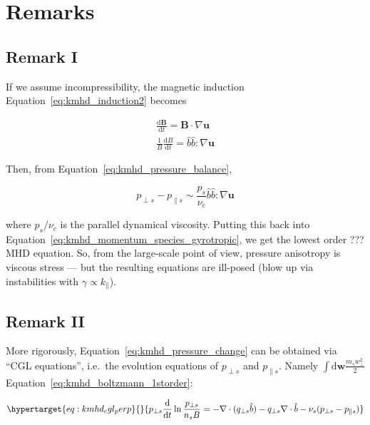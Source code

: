 \documentclass[
  notoc %
]{tufte-book}
\begin{document}
\hypertarget{remarks}{%
\section{Remarks}\label{remarks}}

\hypertarget{remark-i}{%
\subsection{Remark I}\label{remark-i}}

If we assume incompressibility, the magnetic induction
Equation~\ref{eq:kmhd_induction2} becomes

\[
\begin{aligned}
\frac{\mathrm{d}\mathbf{B}}{\mathrm{d}t} = \mathbf{B}\cdot\nabla\mathbf{u} \\
\frac{1}{B}\frac{\mathrm{d}B}{\mathrm{d}t} = \hat{b}\hat{b}:\nabla\mathbf{u}
\end{aligned}
\]

Then, from Equation~\ref{eq:kmhd_pressure_balance},

\[
p_{\perp s} - p_{\parallel s}\sim\frac{p_s}{\nu_c}\hat{b}\hat{b}:\nabla\mathbf{u}
\]

where \(p_s/\nu_c\) is the parallel dynamical viscosity. Putting this
back into Equation~\ref{eq:kmhd_momentum_species_gyrotropic}, we get the
lowest order ??? MHD equation. So, from the large-scale point of view,
pressure anisotropy is viscous stress --- but the resulting equations
are ill-posed (blow up via instabilities with
\(\gamma\propto k_\parallel\)).

\hypertarget{remark-ii}{%
\subsection{Remark II}\label{remark-ii}}

More rigorously, Equation~\ref{eq:kmhd_pressure_change} can be obtained
via ``CGL equations'', i.e.~the evolution equations of \(p_{\perp s}\)
and \(p_{\parallel s}\). Namely
\(\int \mathrm{d}\mathbf{w}\frac{m_sw_\perp^2}{2}\)
Equation~\ref{eq:kmhd_boltzmann_1storder}:

\begin{equation}\protect\hypertarget{eq:kmhd_cgl_perp}{}{
p_{\perp s}\frac{\mathrm{d}}{\mathrm{d}t}\ln\frac{p_{\perp s}}{n_s B} = -\nabla\cdot(q_{\perp s}\hat{b}) - q_{\perp s}\nabla\cdot\hat{b} - \nu_s(p_{\perp s} - p_{\parallel s})
}\label{eq:kmhd_cgl_perp}\end{equation}
\end{document}
